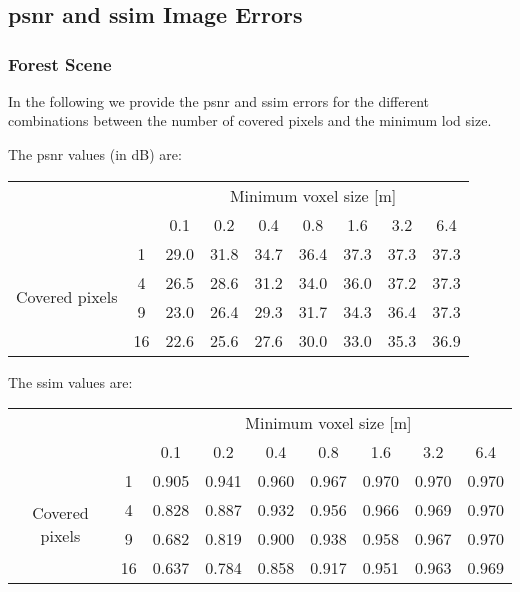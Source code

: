 \chapter{}

\section{\acs{psnr} and \acs{ssim} Image Errors}
\label{sec:psnr_and_ssim_errors}

\subsection{Forest Scene}
In the following we provide the \ac{psnr} and \ac{ssim} errors for the different combinations between the number of covered pixels and the minimum \ac{lod} size.

The \ac{psnr} values (in dB) are:
\begin{center}
    \begin{tabular}{| c | c | c | c | c | c | c | c | c |}
        \cline{3-9}
        \multicolumn{2}{c|}{} & \multicolumn{7}{c|}{Minimum voxel size [m]} \\
        \cline{3-9}
        \multicolumn{2}{c|}{} & 0.1 & 0.2 & 0.4 & 0.8 & 1.6 & 3.2 & 6.4 \\
        \hline
        \multirow{4}{*}{Covered pixels}& 1 & 29.0 & 31.8 & 34.7 & 36.4 & 37.3 & 37.3 & 37.3 \\
        \cline{2-9}
        & 4 & 26.5 & 28.6 & 31.2 & 34.0 & 36.0 & 37.2 & 37.3 \\
        \cline{2-9}
        & 9 & 23.0 & 26.4 & 29.3 & 31.7 & 34.3 & 36.4 & 37.3 \\
        \cline{2-9}
        & 16 & 22.6 & 25.6 & 27.6 & 30.0 & 33.0 & 35.3 & 36.9 \\
        \hline
    \end{tabular}
\end{center}

The \ac{ssim} values are:
\begin{center}
    \begin{tabular}{| c | c | c | c | c | c | c | c | c |}
        \cline{3-9}
        \multicolumn{2}{c|}{} & \multicolumn{7}{c|}{Minimum voxel size [m]} \\
        \cline{3-9}
        \multicolumn{2}{c|}{} & 0.1 & 0.2 & 0.4 & 0.8 & 1.6 & 3.2 & 6.4 \\
        \hline
        \multirow{4}{*}{Covered pixels}& 1 & 0.905 & 0.941 & 0.960 & 0.967 & 0.970 & 0.970 & 0.970 \\
        \cline{2-9}
        & 4 & 0.828 & 0.887 & 0.932 & 0.956 & 0.966 & 0.969 & 0.970 \\
        \cline{2-9}
        & 9 & 0.682 & 0.819 & 0.900 & 0.938 & 0.958 & 0.967 & 0.970 \\
        \cline{2-9}
        & 16 & 0.637 & 0.784 & 0.858 & 0.917 & 0.951 & 0.963 & 0.969 \\
        \hline
    \end{tabular}
\end{center}

